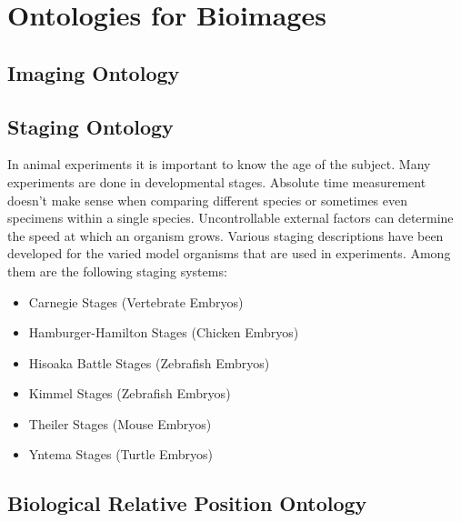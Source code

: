
\chapter{Ontologies for Bioimages} %

\label{Chapter 3} %



\section{Imaging Ontology}


\section{Staging Ontology}

In animal experiments it is important to
know the age of the subject. Many experiments are done in
developmental stages. Absolute time
measurement doesn't make sense when comparing different species or
sometimes even specimens within a single species. Uncontrollable
external factors can determine the speed at which an organism
grows. Various staging descriptions have been developed for the varied
model organisms that are used in experiments. Among them are the
following staging systems:

\begin{itemize}
\item Carnegie Stages\cite{CarnegieStage}
  (Vertebrate Embryos)
\item Hamburger-Hamilton
  Stages\cite{HamburgerHamiltonStage}
  (Chicken Embryos)
\item Hisoaka Battle
  Stages\cite{HisaokaBattleStage}
  (Zebrafish Embryos)
\item Kimmel Stages\cite{KimmelStage} (Zebrafish
  Embryos)
\item Theiler Stages\cite{TheilerStage} (Mouse
  Embryos)
\item Yntema Stages\cite{YntemaStage} (Turtle
  Embryos)
\end{itemize}



\section{Biological Relative Position Ontology}

